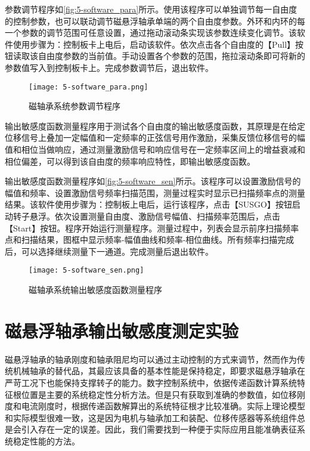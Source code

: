 \documentclass[
  lang=cn,
  degree=master,
  openany,oneside
]{nuaathesis}
\begin{document}
参数调节程序如\autoref{fig:5-software_para}所示。使用该程序可以单独调节每一自由度的控制参数，也可以联动调节磁悬浮轴承单端的两个自由度参数。外环和内环的每一个参数的调节范围可任意设置，通过拖动滚动条实现该参数连续变化调节。该软件使用步骤为：控制板卡上电后，启动该软件。依次点击各个自由度的【Pull】按钮读取该自由度参数的当前值。手动设置各个参数的范围，拖拉滚动条即可将新的参数值写入到控制板卡上。完成参数调节后，退出软件。

\begin{figure}[h!]
	\texttt{[image: 5-software\_para.png]}
	\caption{磁轴承系统参数调节程序}
	\label{fig:5-software_para}
\end{figure}

输出敏感度函数测量程序用于测试各个自由度的输出敏感度函数，其原理是在给定位移信号上叠加一定幅值和一定频率的正弦信号用作激励，采集反馈位移信号的幅值和相位当做响应，通过测量激励信号和响应信号在一定频率区间上的增益衰减和相位偏差，可以得到该自由度的频率响应特性，即输出敏感度函数。

输出敏感度函数测量程序如\autoref{fig:5-software_sen}所示。该程序可以设置激励信号的幅值和频率、设置激励信号频率扫描范围，测量过程实时显示已扫描频率点的测量结果。该软件使用步骤为：控制板上电后，运行该程序，点击【SUSGO】按钮启动转子悬浮。依次设置测量自由度、激励信号幅值、扫描频率范围后，点击【Start】按钮。程序开始运行测量程序。测量过程中，列表会显示前序扫描频率点和扫描结果，图框中显示频率-幅值曲线和频率-相位曲线。所有频率扫描完成后，可以选择继续测量下一通道。完成测量后退出软件。

\begin{figure}[h!]
	\texttt{[image: 5-software\_sen.png]}
	\caption{磁轴承系统输出敏感度函数测量程序}
	\label{fig:5-software_sen}
\end{figure}

\section{磁悬浮轴承输出敏感度测定实验}
磁悬浮轴承的轴承刚度和轴承阻尼均可以通过主动控制的方式来调节，然而作为传统机械轴承的替代品，其最应该具备的基本性能是保持稳定，即要求磁悬浮轴承在严苛工况下也能保持支撑转子的能力。数字控制系统中，依据传递函数计算系统特征根位置是主要的系统稳定性分析方法。但是只有获取到准确的参数值，如位移刚度和电流刚度时，根据传递函数解算出的系统特征根才比较准确。实际上理论模型和实际模型很难一致，这是因为电机与轴承加工和装配、位移传感器等系统组件总是会引入存在一定的误差。因此，我们需要找到一种便于实际应用且能准确表征系统稳定性能的方法。
\end{document}
